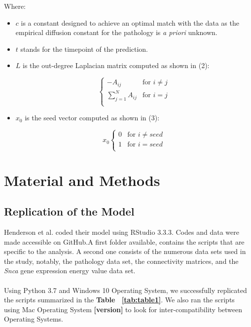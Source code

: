 Where:
\begin{itemize}
\item $c$ is a constant designed to achieve an optimal match with the data as the empirical diffusion constant for the pathology is \textit{a priori} unknown.
\item $t$ stands for the timepoint of the prediction. 
\item $L$ is the out-degree Laplacian matrix computed as shown in (2):

  \begin{equation}
    \begin{cases}
      -A_{ij} & \text{for $i \neq j$} \\
      \sum_{j=1}^N A_{ij} & \text{for $i=j$} \\
  \end{cases}
\end{equation}
\item  $x_{0}$ is the seed vector computed as shown in (3):
  
  \begin{equation}
    x_{0}
    \begin{cases}
        0 & \text{for $i \neq seed$} \\
        1 & \text{for $i = seed$} \\
    \end{cases}
  \end{equation}
\end{itemize}
   

\section{Material and Methods}
\subsection{Replication of the Model}
Henderson et al. coded their model using RStudio 3.3.3. Codes and data were made accessible on GitHub.A first folder available, contains the scripts that are specific to the analysis. A second one consists of the numerous data sets used in the study, notably, the pathology data set, the connectivity matrices, and the \textit{Snca} gene expression energy value data set.\\
\\
Using Python 3.7 and Windows 10 Operating System, we successfully replicated the scripts summarized in the \textbf{Table ~\ref{tab:table1}}. We also ran the scripts using Mac Operating System \textbf{ [version] } to look for inter-compatibility between Operating Systems.\\

